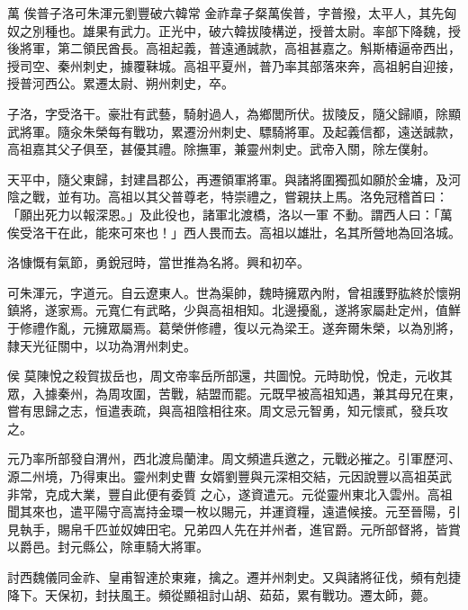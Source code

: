 
\begin{pinyinscope}

 萬
 俟普子洛可朱渾元劉豐破六韓常
 金祚韋子粲萬俟普，字普撥，太平人，其先匈奴之別種也。雄果有武力。正光中，破六韓拔陵構逆，授普太尉。率部下降魏，授後將軍，第二領民酋長。高祖起義，普遠通誠款，高祖甚嘉之。斛斯椿逼帝西出，授司空、秦州刺史，據覆靺城。高祖平夏州，普乃率其部落來奔，高祖躬自迎接，授普河西公。累遷太尉、朔州刺史，卒。



 子洛，字受洛干。豪壯有武藝，騎射過人，為鄉閭所伏。拔陵反，隨父歸順，除顯武將軍。隨汆朱榮每有戰功，累遷汾州刺史、驃騎將軍。及起義信都，遠送誠款，高祖嘉其父子俱至，甚優其禮。除撫軍，兼靈州刺史。武帝入關，除左僕射。



 天平中，隨父東歸，封建昌郡公，再遷領軍將軍。與諸將圍獨孤如願於金墉，及河陰之戰，並有功。高祖以其父普尊老，特崇禮之，嘗親扶上馬。洛免冠稽首曰：「願出死力以報深恩。」及此役也，諸軍北渡橋，洛以一軍
 不動。謂西人曰：「萬俟受洛干在此，能來可來也！」西人畏而去。高祖以雄壯，名其所營地為回洛城。



 洛慷慨有氣節，勇銳冠時，當世推為名將。興和初卒。



 可朱渾元，字道元。自云遼東人。世為渠帥，魏時擁眾內附，曾祖護野肱終於懷朔鎮將，遂家焉。元寬仁有武略，少與高祖相知。北邊擾亂，遂將家屬赴定州，值鮮于修禮作亂，元擁眾屬焉。葛榮併修禮，復以元為梁王。遂奔爾朱榮，以為別將，隸天光征關中，以功為渭州刺史。



 侯
 莫陳悅之殺賀拔岳也，周文帝率岳所部還，共圖悅。元時助悅，悅走，元收其眾，入據秦州，為周攻圍，苦戰，結盟而罷。元既早被高祖知遇，兼其母兄在東，嘗有思歸之志，恒遣表疏，與高祖陰相往來。周文忌元智勇，知元懷貳，發兵攻之。



 元乃率所部發自渭州，西北渡烏蘭津。周文頻遣兵邀之，元戰必摧之。引軍歷河、源二州境，乃得東出。靈州刺史曹女婿劉豐與元深相交結，元因說豐以高祖英武非常，克成大業，豐自此便有委質
 之心，遂資遣元。元從靈州東北入雲州。高祖聞其來也，遣平陽守高嵩持金環一枚以賜元，并運資糧，遠遣候接。元至晉陽，引見執手，賜帛千匹並奴婢田宅。兄弟四人先在并州者，進官爵。元所部督將，皆賞以爵邑。封元縣公，除車騎大將軍。



 討西魏儀同金祚、皇甫智達於東雍，擒之。遷并州刺史。又與諸將征伐，頻有剋捷降下。天保初，封扶風王。頻從顯祖討山胡、茹茹，累有戰功。遷太師，薨。




\end{pinyinscope}

